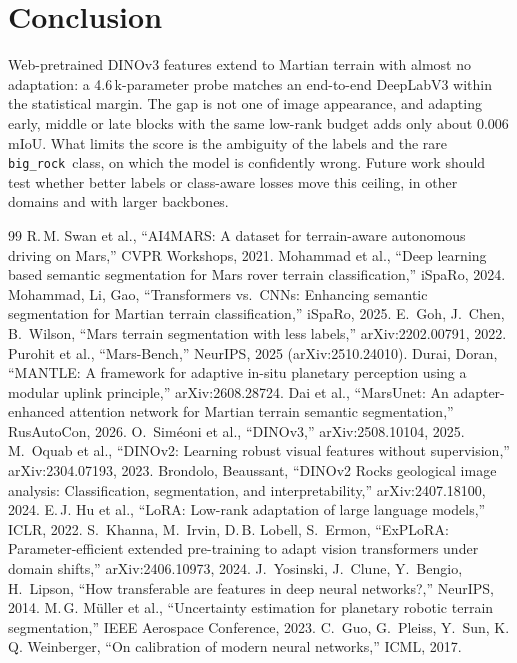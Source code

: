 \documentclass[conference]{IEEEtran}
\newcommand{\bigrock}{\texttt{big\_rock}}
\begin{document}
\section{Conclusion}\label{sec:conclusion}
Web-pretrained DINOv3 features extend to Martian terrain with almost no adaptation: a 4.6\,k-parameter probe matches an end-to-end DeepLabV3 within the statistical margin. The gap is not one of image appearance, and adapting early, middle or late blocks with the same low-rank budget adds only about 0.006 mIoU. What limits the score is the ambiguity of the labels and the rare \bigrock\ class, on which the model is confidently wrong. Future work should test whether better labels or class-aware losses move this ceiling, in other domains and with larger backbones.

\begin{thebibliography}{99}\footnotesize
{} R.\,M. Swan et al., ``AI4MARS: A dataset for terrain-aware autonomous driving on Mars,'' CVPR Workshops, 2021.
 Mohammad et al., ``Deep learning based semantic segmentation for Mars rover terrain classification,'' iSpaRo, 2024.
 Mohammad, Li, Gao, ``Transformers vs.\ CNNs: Enhancing semantic segmentation for Martian terrain classification,'' iSpaRo, 2025.
 E.~Goh, J.~Chen, B.~Wilson, ``Mars terrain segmentation with less labels,'' arXiv:2202.00791, 2022.
 Purohit et al., ``Mars-Bench,'' NeurIPS, 2025 (arXiv:2510.24010).
 Durai, Doran, ``MANTLE: A framework for adaptive in-situ planetary perception using a modular uplink principle,'' arXiv:2608.28724.
 Dai et al., ``MarsUnet: An adapter-enhanced attention network for Martian terrain semantic segmentation,'' RusAutoCon, 2026.
 O.~Sim\'eoni et al., ``DINOv3,'' arXiv:2508.10104, 2025.
 M.~Oquab et al., ``DINOv2: Learning robust visual features without supervision,'' arXiv:2304.07193, 2023.
 Brondolo, Beaussant, ``DINOv2 Rocks geological image analysis: Classification, segmentation, and interpretability,'' arXiv:2407.18100, 2024.
 E.\,J. Hu et al., ``LoRA: Low-rank adaptation of large language models,'' ICLR, 2022.
 S.~Khanna, M.~Irvin, D.\,B. Lobell, S.~Ermon, ``ExPLoRA: Parameter-efficient extended pre-training to adapt vision transformers under domain shifts,'' arXiv:2406.10973, 2024.
 J.~Yosinski, J.~Clune, Y.~Bengio, H.~Lipson, ``How transferable are features in deep neural networks?,'' NeurIPS, 2014.
 M.\,G. M\"uller et al., ``Uncertainty estimation for planetary robotic terrain segmentation,'' IEEE Aerospace Conference, 2023.
 C.~Guo, G.~Pleiss, Y.~Sun, K.\,Q. Weinberger, ``On calibration of modern neural networks,'' ICML, 2017.
\end{thebibliography}
\end{document}
